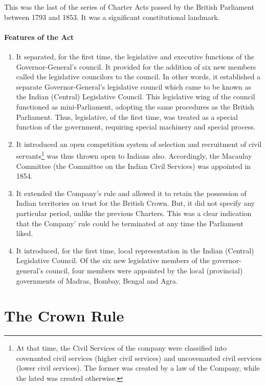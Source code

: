 This was the last of the series of Charter Acts passed by the British Parliament between 1793 and 1853. It was a significant constitutional landmark.
\paragraph{Features of the Act}

\begin{enumerate}
  \item It separated, for the first time, the legislative and executive functions of the Governor-General's council. It provided for the addition of six new members called the legislative councilors to the council. In other words, it established a separate Governor-General's legislative council which came to be known as the Indian (Central) Legislative Council. This legislative wing of the council functioned as mini-Parliament, adopting the same procedures as the British Parliament. Thus, legislative, of the first time, was treated as a special function of the government, requiring special machinery and special process.
  \item It introduced an open competition system of selection and recruitment of civil servants\footnote{At that time, the Civil Services of the company were classified into covenanted civil services (higher civil services) and uncovenanted civil services (lower civil services). The former was created by a law of the Company, while the lated was created otherwise.} was thus thrown open to Indians also. Accordingly, the Macaulay Committee (the Committee on the Indian Civil Services) was appointed in 1854.
  \item It extended the Company's rule and allowed it to retain the possession of Indian territories on trust for the British Crown. But, it did not specify any particular period, unlike the previous Charters. This was a clear indication that the Company' rule could be terminated at any time the Parliament liked.
  \item It introduced, for the first time, local representation in the Indian (Central) Legislative Council. Of the six new legislative members of the governor-general's council, four members were appointed by the local (provincial) governments of Madras, Bombay, Bengal and Agra.
\end{enumerate}

\section{The Crown Rule}

